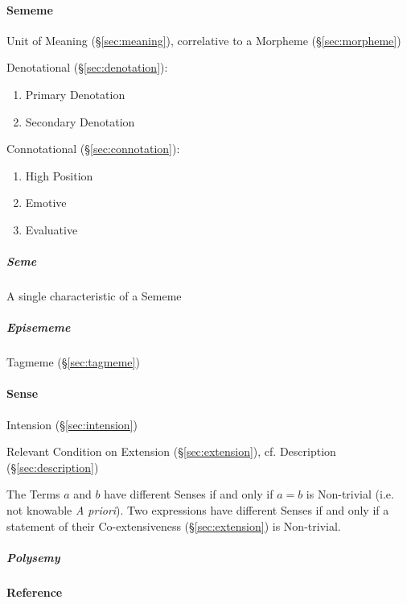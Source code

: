\paragraph{Sememe}\label{sec:sememe}\hfill

Unit of Meaning (\S\ref{sec:meaning}), correlative to a Morpheme
(\S\ref{sec:morpheme})

Denotational (\S\ref{sec:denotation}):

\begin{enumerate}
  \item Primary Denotation
  \item Secondary Denotation
\end{enumerate}

Connotational (\S\ref{sec:connotation}):

\begin{enumerate}
  \item High Position
  \item Emotive
  \item Evaluative
\end{enumerate}



\subparagraph{Seme}\label{sec:seme}\hfill

A single characteristic of a Sememe



\subparagraph{Episememe}\label{sec:episememe}\hfill

Tagmeme (\S\ref{sec:tagmeme})



\paragraph{Sense}\label{sec:sense}\hfill
\cite{chalmers02}

Intension (\S\ref{sec:intension})

Relevant Condition on Extension (\S\ref{sec:extension}), cf.
Description (\S\ref{sec:description})

The Terms $a$ and $b$ have different Senses if and only if $a = b$ is
Non-trivial (i.e. not knowable \emph{A priori}). Two expressions have
different Senses if and only if a statement of their Co-extensiveness
(\S\ref{sec:extension}) is Non-trivial.

\subparagraph{Polysemy}\label{sec:polysemy}\hfill



\paragraph{Reference}\label{sec:reference}\hfill

